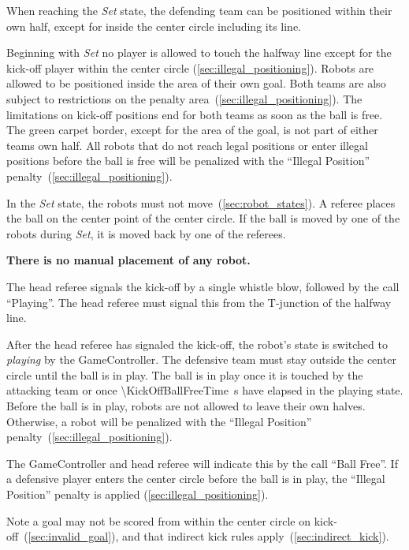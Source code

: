 When reaching the \textit{Set} state, the defending team can be positioned within their own half, except for inside the center circle including its line.

Beginning with \textit{Set} no player is allowed to touch the halfway line except for the kick-off player within the center circle (\cf \cref{sec:illegal_positioning}).
Robots are allowed to be positioned inside the area of their own goal.
Both teams are also subject to restrictions on the penalty area~(\cf \cref{sec:illegal_positioning}).
The limitations on kick-off positions end for both teams as soon as the ball is free.
The green carpet border, except for the area of the goal, is not part of either teams own half.
All robots that do not reach legal positions or enter illegal positions before the ball is free will be penalized with the ``Illegal Position'' penalty~(\cf \cref{sec:illegal_positioning}).

In the \emph{Set} state, the robots must not move~(\cf \cref{sec:robot_states}). A referee places the ball on the center point of the center circle. If the ball is moved by one of the robots during \textit{Set}, it is moved back by one of the referees.

\textbf{There is no manual placement of any robot.}

The head referee signals the kick-off by a single whistle blow, followed by the call ``Playing''. The head referee must signal this from the T-junction of the halfway line.

After the head referee has signaled the kick-off, the robot's state is switched to \emph{playing} by the GameController.
The defensive team must stay outside the center circle until the ball is in play. The ball is in play once it is touched by the attacking team or once \qty{\KickOffBallFreeTime}{\second} have elapsed in the playing state. Before the ball is in play, robots are not allowed to leave their own halves. Otherwise, a robot will be penalized with the ``Illegal Position'' penalty~(\cf \cref{sec:illegal_positioning}).

The GameController and head referee will indicate this by the call ``Ball Free''.
If a defensive player enters the center circle before the ball is in play, the ``Illegal Position'' penalty is applied (\cf \cref{sec:illegal_positioning}).

Note a goal may not be scored from within the center circle on kick-off~(\cf \cref{sec:invalid_goal}), and that indirect kick rules apply~(\cf \cref{sec:indirect_kick}).

